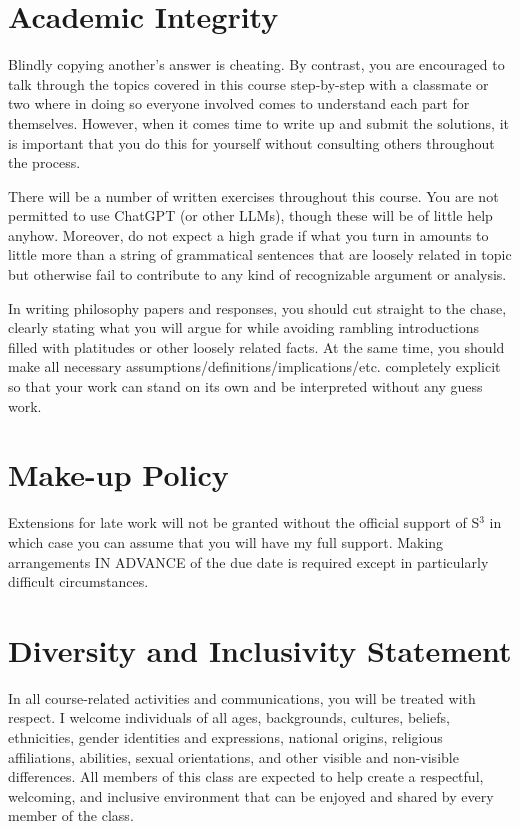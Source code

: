 \documentclass[letterpaper]{infinity_syllabus} %
\begin{document}
\vspace{0.5cm}
\section{Academic Integrity}

Blindly copying another's answer is cheating.
By contrast, you are encouraged to talk through the topics covered in this course step-by-step with a classmate or two where in doing so everyone involved comes to understand each part for themselves.
However, when it comes time to write up and submit the solutions, it is important that you do this for yourself without consulting others throughout the process.

There will be a number of written exercises throughout this course.
You are not permitted to use ChatGPT (or other LLMs), though these will be of little help anyhow.
Moreover, do not expect a high grade if what you turn in amounts to little more than a string of grammatical sentences that are loosely related in topic but otherwise fail to contribute to any kind of recognizable argument or analysis.

In writing philosophy papers and responses, you should cut straight to the chase, clearly stating what you will argue for while avoiding rambling introductions filled with platitudes or other loosely related facts.
At the same time, you should make all necessary assumptions/definitions/implications/etc. completely explicit so that your work can stand on its own and be interpreted without any guess work.

\vspace{0.5cm}
\section{Make-up Policy}

Extensions for late work will not be granted without the official support of S$^3$ in which case you can assume that you will have my full support.
Making arrangements IN ADVANCE of the due date is required except in particularly difficult circumstances.

\vspace{0.5cm}
\section{Diversity and Inclusivity Statement}

In all course-related activities and communications, you will be treated with respect.
I welcome individuals of all ages, backgrounds, cultures, beliefs, ethnicities, gender identities and expressions, national origins, religious affiliations, abilities, sexual orientations, and other visible and non-visible differences.
All members of this class are expected to help create a respectful, welcoming, and inclusive environment that can be enjoyed and shared by every member of the class.
\end{document}
